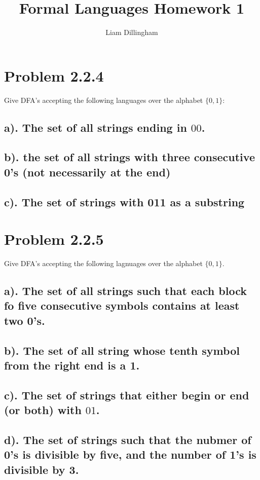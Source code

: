 \documentclass[20pt]{article} %
\title{Formal Languages Homework 1}
\author{Liam Dillingham}
\begin{document}
\maketitle

\section{Problem 2.2.4}
Give DFA's accepting the following languages over the alphabet $\{0,1\}$:
\subsection{a). The set of all strings ending in $00$.}

\subsection{b). the set of all strings with three consecutive 0's (not necessarily at the end)}

\subsection{c). The set of strings with 011 as a substring}

\section{Problem 2.2.5}
Give DFA's accepting the following lagnuages over the alphabet $\{0,1\}$.
\subsection{a). The set of all strings such that each block fo five consecutive symbols contains at least two 0's.}

\subsection{b). The set of all string whose tenth symbol from the right end is a 1.}

\subsection{c). The set of strings that either begin or end (or both) with $01$.}

\subsection{d). The set of strings such that the nubmer of 0's is divisible by five, and the number of 1's is divisible by 3.}
\end{document}
